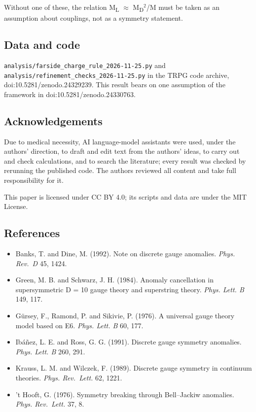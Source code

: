 \documentclass[
  11pt,
]{article}
\providecommand{\tightlist}{%
  \setlength{\itemsep}{0pt}\setlength{\parskip}{0pt}}
\begin{document}
Without one of these, the relation M\textsubscript{L} \ensuremath{\approx} M\textsubscript{D}\ensuremath{^{2}}/M must be taken as an assumption about couplings, not as a symmetry statement.

\hypertarget{data-and-code}{%
\subsection{Data and code}\label{data-and-code}}

\texttt{analysis/farside\_charge\_rule\_2026-11-25.py} and \texttt{analysis/refinement\_checks\_2026-11-25.py} in the TRPG code archive, doi:10.5281/zenodo.24329239. This result bears on one assumption of the framework in doi:10.5281/zenodo.24330763.

\hypertarget{acknowledgements}{%
\subsection{Acknowledgements}\label{acknowledgements}}

Due to medical necessity, AI language-model assistants were used, under the authors' direction, to draft and edit text from the authors' ideas, to carry out and check calculations, and to search the literature; every result was checked by rerunning the published code. The authors reviewed all content and take full responsibility for it.

This paper is licensed under CC BY 4.0; its scripts and data are under the MIT License.

\hypertarget{references}{%
\subsection{References}\label{references}}

\begin{itemize}
\tightlist
\item
  Banks, T. and Dine, M. (1992). Note on discrete gauge anomalies. \emph{Phys. Rev.~D} 45, 1424.
\item
  Green, M. B. and Schwarz, J. H. (1984). Anomaly cancellation in supersymmetric D = 10 gauge theory and superstring theory. \emph{Phys. Lett. B} 149, 117.
\item
  Gürsey, F., Ramond, P. and Sikivie, P. (1976). A universal gauge theory model based on E6. \emph{Phys. Lett. B} 60, 177.
\item
  Ibáñez, L. E. and Ross, G. G. (1991). Discrete gauge symmetry anomalies. \emph{Phys. Lett. B} 260, 291.
\item
  Krauss, L. M. and Wilczek, F. (1989). Discrete gauge symmetry in continuum theories. \emph{Phys. Rev.~Lett.} 62, 1221.
\item
  't Hooft, G. (1976). Symmetry breaking through Bell--Jackiw anomalies. \emph{Phys. Rev.~Lett.} 37, 8.
\end{itemize}
\end{document}
